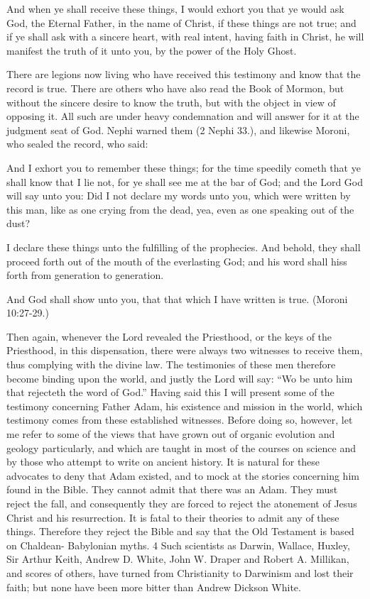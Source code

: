 And when ye shall receive these things, I would exhort you that ye would ask God, the
Eternal Father, in the name of Christ, if these things are not true; and if ye shall ask with a
sincere heart, with real intent, having faith in Christ, he will manifest the truth of it unto you,
by the power of the Holy Ghost.

There are legions now living who have received this testimony and know that the record is
true. There are others who have also read the Book of Mormon, but without the sincere desire
to know the truth, but with the object in view of opposing it. All such are under heavy
condemnation and will answer for it at the judgment seat of God. Nephi warned them (2
Nephi 33.), and likewise Moroni, who sealed the record, who said:

And I exhort you to remember these things; for the time speedily cometh that ye shall know
that I lie not, for ye shall see me at the bar of God; and the Lord God will say unto you: Did I
not declare my words unto you, which were written by this man, like as one crying from the
dead, yea, even as one speaking out of the dust?

I declare these things unto the fulfilling of the prophecies. And behold, they shall proceed
forth out of the mouth of the everlasting God; and his word shall hiss forth from generation
to generation.

And God shall show unto you, that that which I have written is true. (Moroni 10:27-29.)

Then again, whenever the Lord revealed the Priesthood, or the keys of the Priesthood, in this
dispensation, there were always two witnesses to receive them, thus complying with the
divine law. The testimonies of these men therefore become binding upon the world, and
justly the Lord will say: ``Wo be unto him that rejecteth the word of God.'' Having said this I
will present some of the testimony concerning Father Adam, his existence and mission in the
world, which testimony comes from these established witnesses. Before doing so, however,
let me refer to some of the views that have grown out of organic evolution and geology
particularly, and which are taught in most of the courses on science and by those who attempt
to write on ancient history. It is natural for these advocates to deny that Adam existed, and to
mock at the stories concerning him found in the Bible. They cannot admit that there was an
Adam. They must reject the fall, and consequently they are forced to reject the atonement of
Jesus Christ and his resurrection. It is fatal to their theories to admit any of these things.
Therefore they reject the Bible and say that the Old Testament is based on Chaldean-
Babylonian myths. 4 Such scientists as Darwin, Wallace, Huxley, Sir Arthur Keith, Andrew
D. White, John W. Draper and Robert A. Millikan, and scores of others, have turned from
Christianity to Darwinism and lost their faith; but none have been more bitter than Andrew
Dickson White.

